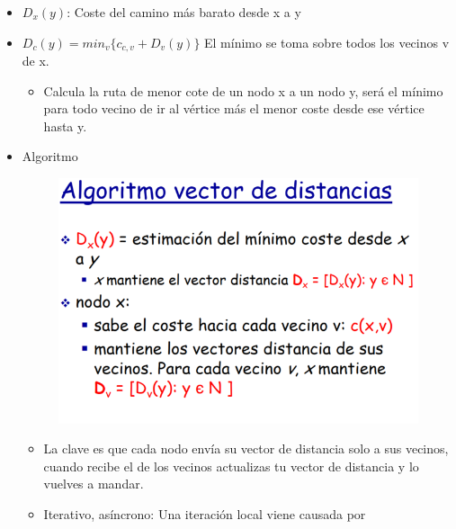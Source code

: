 \documentclass[12pt, twoside, openright]{report} %
\begin{document}
    \begin{itemize}
    \item
      \(D_x(y)\): Coste del camino más barato desde x a y
    \item
      \(D_c(y)=min_v \{ c_{c,v}+D_v(y)\}\) El mínimo se toma sobre todos
      los vecinos v de x.

      \begin{itemize}
      \item
        Calcula la ruta de menor cote de un nodo x a un nodo y, será el
        mínimo para todo vecino de ir al vértice más el menor coste
        desde ese vértice hasta y.
      \end{itemize}
	  \item
    Algoritmo
	\begin{figure}[H]
		{\includegraphics[scale=.35]{Untitled 42.png}}
	\end{figure}
    \begin{itemize}
    \item
      La clave es que cada nodo envía su vector de distancia solo a sus
      vecinos, cuando recibe el de los vecinos actualizas tu vector de
      distancia y lo vuelves a mandar.
    \item
      Iterativo, asíncrono: Una iteración local viene causada por


\end{itemize}
\end{itemize}
\end{document}
